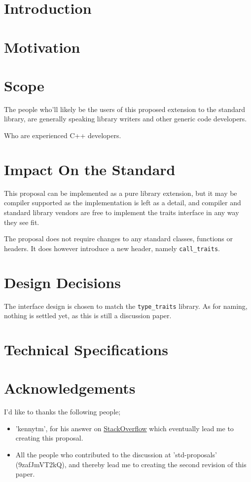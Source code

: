 
\tableofcontents

\section{Introduction}


\section{Motivation}


\section{Scope}
The people who'll likely be the users of this proposed extension to the standard
library, are generally speaking library writers and other generic code developers.

Who are experienced C++ developers.

\section{Impact On the Standard}
This proposal can be implemented as a pure library extension, but it may be
compiler supported as the implementation is left as a detail, and compiler and
standard library vendors are free to implement the traits interface in any
way they see fit.

The proposal does not require changes to any standard classes, functions or headers.
It does however introduce a new header, namely \verb|call_traits|.

\section{Design Decisions}
The interface design is chosen to match the \verb|type_traits| library. As for
naming, nothing is settled yet, as this is still a discussion paper.

\section{Technical Specifications}


\section{Acknowledgements}
I'd like to thanks the following people;
\begin{itemize}
\item 'kennytm', for his answer on \href{http://stackoverflow.com/questions/7943525/is-it-possible-to-figure-out-the-parameter-type-and-return-type-of-a-lambda}{StackOverflow} which eventually lead me to creating this proposal.
\item All the people who contributed to the discussion at 'std-proposals'
      (9zafJmVT2kQ), and thereby lead me to creating the second revision
      of this paper.
\end{itemize}
